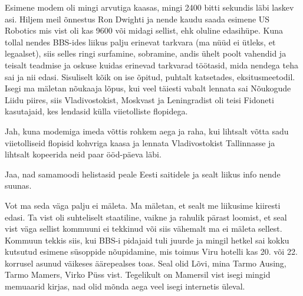 Esimene modem oli  mingi arvutiga kaasas, mingi 2400 bitti sekundis läbi laskev 
asi. Hiljem meil õnnestus Ron Dwighti ja nende kaudu 
saada esimene US Robotics mis vist oli kas 9600 või midagi 
sellist, ehk oluline edasihüpe. Kuna tollal nendes BBS-ides liikus palju 
erinevat tarkvara (ma nüüd ei ütleks, et  legaalset), siis selles ringi 
surfamine, sobramine, andis ühelt poolt vahendid ja teisalt  teadmise ja oskuse 
kuidas  erinevad tarkvarad töötasid, mida nendega teha sai ja nii edasi. 
Sisuliselt kõik on  ise õpitud,  puhtalt  katsetades, eksitusmeetodil. Isegi 
ma mäletan nõukaaja lõpus, kui veel täiesti vabalt lennata sai Nõukogude Liidu 
piires, siis Vladivostokist, Moskvast ja Leningradist oli teisi Fidoneti 
kasutajaid, kes lendasid külla viietolliste flopidega.
                 

Jah,  kuna modemiga imeda võttis  rohkem aega ja raha, kui lihtsalt võtta  
sadu viietolliseid flopisid kohvriga kaasa ja  lennata Vladivostokist 
Tallinnasse ja lihtsalt kopeerida neid paar ööd-päeva läbi.


Jaa, nad samamoodi helistasid peale Eesti saitidele ja sealt liikus info nende 
suunas. 

                 
Vot ma seda väga palju ei mäleta. Ma mäletan, et sealt me liikusime kiiresti 
edasi. Ta vist oli suhteliselt staatiline, vaikne ja rahulik pärast  
loomist, et seal vist väga sellist kommuuni ei tekkinud või siis vähemalt ma ei 
mäleta sellest.  Kommuun tekkis siis, kui BBS-i pidajaid tuli juurde ja mingil 
hetkel sai kokku kutsutud  esimene süsoppide nõupidamine, mis toimus Viru 
hotelli kas  20. või 22. korrusel asunud väikeses äärepealses toas. Seal olid 
Lõvi, mina Tarmo Ausing, Tarmo 
Mamers, Virko Püss vist. 
Tegelikult on Mamersil vist isegi mingid memuaarid kirjas, nad olid mõnda aega 
veel isegi internetis üleval. 


